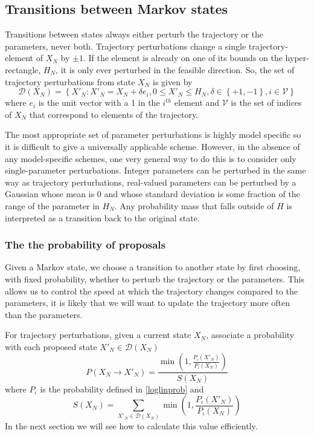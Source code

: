 \documentclass{article}
\begin{document}
\subsection{Transitions between Markov states}

Transitions between states always either perturb the trajectory or the parameters, never both. Trajectory perturbations change a single trajectory-element of $X_N$ by $\pm 1$. If the element is already on one of its bounds on the hyper-rectangle, $H_N$, it is only ever perturbed in the feasible direction. So, the set of trajectory perturbations from state $X_N$ is given by
\[
\mathcal{D}(X_N) = \left\{X'_N : X'_N = X_N + \delta e_i, 0 \le X'_N \le H_N, \delta \in \left\{+1,-1\right\}, i \in \mathcal{V} \right\}
\]
where $e_i$ is the unit vector with a 1 in the $i^{th}$ element and $\mathcal{V}$ is the set of indices of $X_N$ that correspond to elements of the trajectory.

The most appropriate set of parameter perturbations is highly model specific so it is difficult to give a universally applicable scheme. However, in the absence of any model-specific schemes, one very general way to do this is to consider only single-parameter perturbations. Integer parameters can be perturbed in the same way as trajectory perturbations, real-valued parameters can be perturbed by a Gaussian whose mean is 0 and whose standard deviation is some fraction of the range of the parameter in $H_N$. Any probability mass that falls outside of $H$ is interpreted as a transition back to the original state.

\subsubsection{The the probability of proposals}

Given a Markov state, we choose a transition to another state by first choosing, with fixed probability, whether to perturb the trajectory or the parameters. This allows us to control the speed at which the trajectory changes compared to the parameters, it is likely that we will want to update the trajectory more often than the parameters.

For trajectory perturbations, given a current state $X_N$, associate a probability with each proposed state $X'_N \in \mathcal{D}(X_N)$
\begin{equation}
P(X_N \to X'_N) = \frac{\min\left(1, \frac{P_\iota(X'_N)}{P_\iota(X_N)}\right)}{S(X_N)} 
\label{transitionProb}
\end{equation}
where $P_\iota$ is the probability defined in \eqref{loglinprob} and
\begin{equation}
S(X_N) = \sum_{X'_N \in \mathcal{D}(X_N)} \min\left(1, \frac{P_\iota(X'_N)}{P_\iota(X_N)}\right)
\label{transitionSum}
\end{equation}
In the next section we will see how to calculate this value efficiently.
\end{document}

